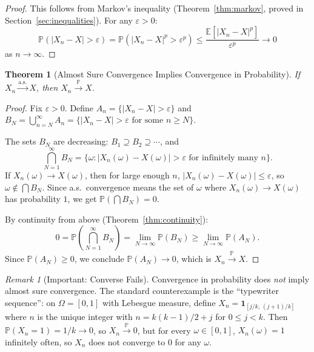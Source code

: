 \documentclass[11pt,a4paper]{article}
\theoremstyle{definition}
\theoremstyle{plain}
\newtheorem{theorem}{Theorem}[section]
\theoremstyle{remark}
\newtheorem{remark}{Remark}[section]
\newcommand{\E}{\mathbb{E}}
\newcommand{\Prob}{\mathbb{P}}
\newcommand{\indicator}{\mathbf{1}}
\newcommand{\cas}{\xrightarrow{\text{a.s.}}}
\newcommand{\cprob}{\xrightarrow{\Prob}}
\begin{document}
\begin{proof}
This follows from Markov's inequality (Theorem~\ref{thm:markov}, proved in Section~\ref{sec:inequalities}). For any $\varepsilon > 0$:
\begin{equation}
    \Prob(|X_n - X| > \varepsilon) = \Prob(|X_n - X|^p > \varepsilon^p) \leq \frac{\E[|X_n - X|^p]}{\varepsilon^p} \to 0
    \label{eq:lp_to_prob_proof}
\end{equation}
as $n \to \infty$.
\end{proof}

\begin{theorem}[Almost Sure Convergence Implies Convergence in Probability]
\label{thm:as_to_prob}
If $X_n \cas X$, then $X_n \cprob X$.
\end{theorem}

\begin{proof}
Fix $\varepsilon > 0$. Define $A_n = \{|X_n - X| > \varepsilon\}$ and $B_N = \bigcup_{n=N}^\infty A_n = \{|X_n - X| > \varepsilon \text{ for some } n \geq N\}$.

The sets $B_N$ are decreasing: $B_1 \supseteq B_2 \supseteq \cdots$, and
\begin{equation}
    \bigcap_{N=1}^\infty B_N = \{\omega : |X_n(\omega) - X(\omega)| > \varepsilon \text{ for infinitely many } n\}.
\end{equation}
If $X_n(\omega) \to X(\omega)$, then for large enough $n$, $|X_n(\omega) - X(\omega)| \leq \varepsilon$, so $\omega \notin \bigcap B_N$. Since a.s.\ convergence means the set of $\omega$ where $X_n(\omega) \to X(\omega)$ has probability $1$, we get $\Prob(\bigcap B_N) = 0$.

By continuity from above (Theorem~\ref{thm:continuity}):
\begin{equation}
    0 = \Prob\!\left(\bigcap_{N=1}^\infty B_N\right) = \lim_{N \to \infty} \Prob(B_N) \geq \lim_{N \to \infty} \Prob(A_N).
\end{equation}
Since $\Prob(A_N) \geq 0$, we conclude $\Prob(A_N) \to 0$, which is $X_n \cprob X$.
\end{proof}

\begin{remark}[Important: Converse Fails]
\label{rem:conv_counterexample}
Convergence in probability does \emph{not} imply almost sure convergence. The standard counterexample is the ``typewriter sequence'': on $\Omega = [0,1]$ with Lebesgue measure, define $X_n = \indicator_{[j/k,\, (j+1)/k]}$ where $n$ is the unique integer with $n = k(k-1)/2 + j$ for $0 \leq j < k$. Then $\Prob(X_n = 1) = 1/k \to 0$, so $X_n \cprob 0$, but for every $\omega \in [0,1]$, $X_n(\omega) = 1$ infinitely often, so $X_n$ does not converge to $0$ for any $\omega$.
\end{remark}
\end{document}
